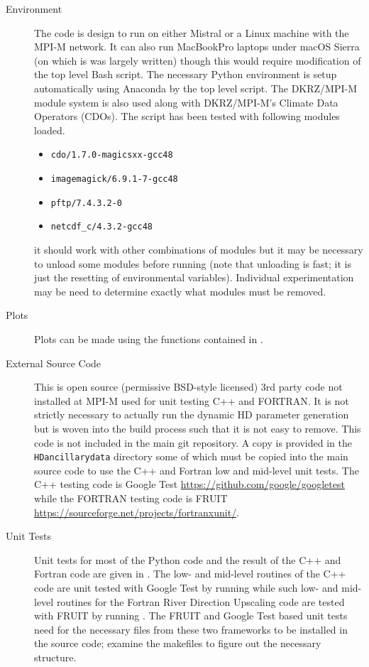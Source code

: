 \documentclass{article}
\begin{document}
\begin{description}
\item[Environment] The code is design to run on either Mistral or a Linux machine with the MPI-M network. It can also run MacBookPro laptops under macOS Sierra (on which is was largely written) though this would require modification of the top level Bash script. The necessary Python environment is setup automatically using Anaconda by the top level script. The DKRZ/MPI-M module system is also used along with DKRZ/MPI-M's Climate Data Operators (CDOs). The script has been tested with following modules loaded.
\begin{itemize}
\item \lstinline[style=bash_input]{cdo/1.7.0-magicsxx-gcc48}
\item \lstinline[style=bash_input]{imagemagick/6.9.1-7-gcc48}
\item \lstinline[style=bash_input]{pftp/7.4.3.2-0}
\item \lstinline[style=bash_input]{netcdf_c/4.3.2-gcc48}
\end{itemize}
it should work with other combinations of modules but it may be necessary to unload some modules before running (note that unloading is fast; it is just the resetting of environmental variables). Individual experimentation may be need to determine exactly what modules must be removed.
\item[Plots] Plots can be made using the functions contained in .
\item[External Source Code] This is open source (permissive BSD-style licensed) 3rd party code not installed at MPI-M used for unit testing C++ and FORTRAN.  It is not strictly necessary to actually run the dynamic HD parameter generation but is woven into the build process such that it is not easy to remove. This code is not included in the main git repository. A copy is provided in the \texttt{HDancillarydata} directory some of which must be copied into the main source code to use the C++ and Fortran low and mid-level unit tests. The C++ testing code is Google Test \url{https://github.com/google/googletest} while the FORTRAN testing code is FRUIT \url{https://sourceforge.net/projects/fortranxunit/}.
\item[Unit Tests] Unit tests for most of the Python code and the result of the C++ and Fortran code are given in . The low- and mid-level routines of the C++ code are unit tested with Google Test by running  while such low- and mid-level routines for the Fortran River Direction Upscaling code are tested with FRUIT by running . The FRUIT and Google Test based unit tests need for the necessary files from these two frameworks to be installed in the source code; examine the makefiles to figure out the necessary structure.

\end{description}
\end{document}
